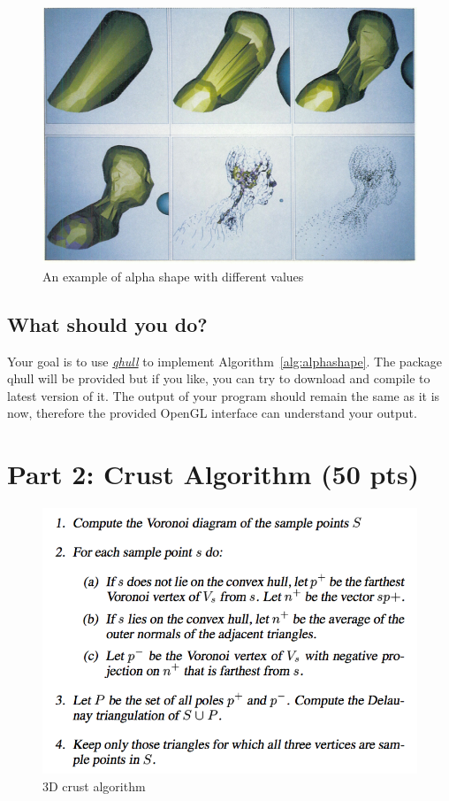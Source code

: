 \documentclass[11pt]{article}
\begin{document}
\begin{figure}[h]
\centering
\includegraphics[width=.5\textwidth]{FIGS/alphashape}
\caption{An example of alpha shape with different values}
\label{alg:alpha}
\end{figure}




\subsection{What should  you do?}

Your goal is to use \href{http://www.qhull.org/}{\it qhull} to implement Algorithm~\ref{alg:alphashape}.
The package qhull will be provided but if you like, you can try to download and compile to latest version of it. 
The output of your program should remain the same as it is now, therefore
the provided OpenGL interface can understand your output.




\section{Part 2: Crust Algorithm (50 pts)}

\begin{figure}[ht]
\centering
\includegraphics[width=.5\textwidth]{FIGS/crust-alg}
\caption{3D crust algorithm}
\label{alg:crust-alg}
\end{figure}
\end{document}

